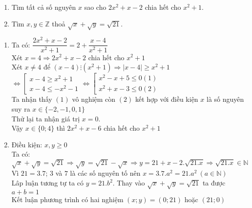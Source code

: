 \begin{bt}%
\hfill
\begin{enumerate}
	\item Tìm tất cả số nguyên $x$ sao cho $2x^2 + x - 2$ chia hết cho $x^2 + 1$.
	\item Tìm $x,y\in \mathbb{Z}$ thoả $\sqrt x  + \sqrt y  = \sqrt {21} $.
\end{enumerate}
\loigiai
{
	
	\begin{enumerate}
		\item Ta có: $\dfrac{{2{x^2} + x - 2}}{{{x^2} + 1}} = 2 + \dfrac{{x - 4}}{{{x^2} + 1}}$\\
		Xét $x=4\Rightarrow 2x^2+x-2$ chia hết cho $x^2+1$\\
		Xét $x\neq 4$ để $(x-4)\vdots (x^2+1)\Rightarrow |x-4|\geq x^2+1$\\
		$ \Leftrightarrow \left[ {\begin{array}{*{20}{c}}
			{x - 4 \ge {x^2} + 1}\\
			{x - 4 \le  - {x^2} - 1}
			\end{array}} \right. \Leftrightarrow \left[ {\begin{array}{*{20}{c}}
			{{x^2} - x + 5 \le 0\left( 1 \right)}\\
			{{x^2} + x - 3 \le 0\left( 2 \right)}
			\end{array}} \right.$\\
		Ta nhận thấy $(1)$ vô nghiệm còn $(2)$ kết hợp với điều kiện $x$ là số nguyên suy ra $x\in \{-2,-1,0,1\}$\\
		Thử lại ta nhận giá trị $x=0$.\\
		Vậy $x\in \{0;4\}$ thì $2x^2+x-6$ chia hết cho $x^2+1$
		\item Điều kiện: $x,y\geq 0$\\
		Ta có: $\sqrt x  + \sqrt y  = \sqrt {21} \Rightarrow\sqrt y  = \sqrt {21}  - \sqrt x  \Rightarrow y = 21 + x - 2.\sqrt {21.x} \Rightarrow \sqrt {21.x}  \in\mathbb{N} $\\
		Vì $21=3.7$; $3$ và $7$ là các số nguyên tố nên $x=3.7.a^2=21.a^2~(a\in \mathbb{N})$\\
		Lâp luận tương tự ta có $y=21.b^2$. Thay vào  $\sqrt x  + \sqrt y  = \sqrt {21}$ ta được $a+b=1$\\
		Kết luận phương trình có hai nghiệm $(x;y)=(0;21)$ hoặc $(21;0)$
	\end{enumerate}
}
\end{bt}
